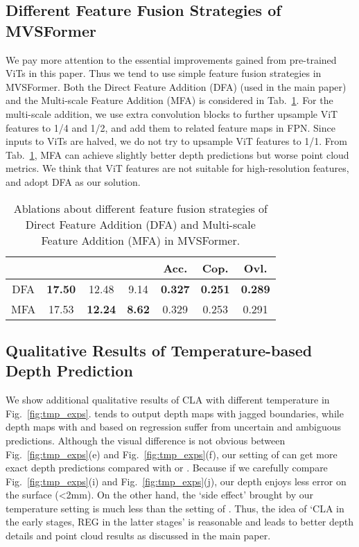 \documentclass[10pt]{article} \usepackage[preprint]{tmlr}
\begin{document}
\subsection{Different Feature Fusion Strategies of MVSFormer}
\label{sec:appendix_fusion_ways}
We pay more attention to the essential improvements gained from pre-trained ViTs in this paper. Thus we tend to use simple feature fusion strategies in MVSFormer. Both the Direct Feature Addition (DFA) (used in the main paper) and the Multi-scale Feature Addition (MFA) is considered in Tab.~\ref{tab:feature_fusion}. For the multi-scale addition, we use extra convolution blocks to further upsample ViT features to 1/4 and 1/2, and add them to related feature maps in FPN. Since inputs to ViTs are halved, we do not try to upsample ViT features to 1/1. From Tab.~\ref{tab:feature_fusion}, MFA can achieve slightly better depth predictions but worse point cloud metrics. We think that ViT features are not suitable for high-resolution features, and adopt DFA as our solution.

\begin{table}[h]
 \caption{Ablations about different feature fusion strategies of Direct Feature Addition (DFA) and Multi-scale Feature Addition (MFA) in MVSFormer.
 \label{tab:feature_fusion}}
 \small
 \centering
\begin{tabular}{ccccccc}
\toprule 
 &  &  &  & Acc. & Cop. & Ovl.\tabularnewline
\midrule
DFA & \textbf{17.50} & 12.48 & 9.14 & \textbf{0.327} & \textbf{0.251} & \textbf{0.289}\tabularnewline
MFA & 17.53 & \textbf{12.24} & \textbf{8.62} & 0.329 & 0.253 & 0.291\tabularnewline
\bottomrule
\end{tabular}
\end{table}

\subsection{Qualitative Results of Temperature-based Depth Prediction}
\label{sec:appendix_quali_temp}

We show additional qualitative results of CLA with different temperature  in Fig.~\ref{fig:tmp_exps}.  tends to output depth maps with jagged boundaries, while depth maps with  and based on regression suffer from uncertain and ambiguous predictions.
Although the visual difference is not obvious between Fig.~\ref{fig:tmp_exps}(e) and Fig.~\ref{fig:tmp_exps}(f),
our setting of  can get more exact depth predictions compared with  or . 
Because if we carefully compare Fig.~\ref{fig:tmp_exps}(i) and Fig.~\ref{fig:tmp_exps}(j), our depth enjoys less error on the surface (<2mm). On the other hand, the `side effect' brought by our temperature setting is much less than the setting of . Thus, the idea of `CLA in the early stages, REG in the latter stages' is reasonable and leads to better depth details and point cloud results as discussed in the main paper.
\end{document}
